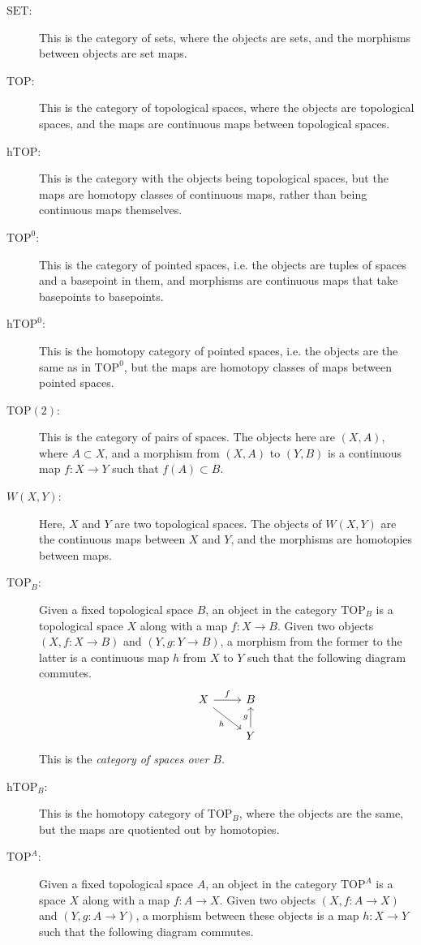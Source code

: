 \documentclass[12pt, notitlepage]{article}
\theoremstyle{definition}
\newcommand{\cat}[1]{\mathrm{#1}}
\begin{document}
\begin{description}
    \item[$\cat{SET}$:] This is the category of sets, where the objects are sets, and the morphisms between objects are set maps.
    \item[$\cat{TOP}$:] This is the category of topological spaces, where the objects are topological spaces, and the maps are continuous maps between topological spaces.
    \item[$\cat{hTOP}$:] This is the category with the objects being topological spaces, but the maps are homotopy classes of continuous maps, rather than being continuous maps themselves.
    \item[$\cat{TOP^0}$:] This is the category of pointed spaces, i.e. the objects are tuples of spaces and a basepoint in them, and morphisms are continuous maps that take basepoints to basepoints.
    \item[$\cat{hTOP^0}$:] This is the homotopy category of pointed spaces, i.e. the objects are the same as in $\cat{TOP^0}$, but the maps are homotopy classes of maps between pointed spaces.
    \item[$\cat{TOP(2)}$:] This is the category of pairs of spaces. The objects here are $(X,A)$, where $A \subset X$, and a morphism from $(X, A)$ to $(Y, B)$ is a continuous map $f: X \to Y$ such that $f(A) \subset B$.
    \item[$W(X,Y)$:] Here, $X$ and $Y$ are two topological spaces. The objects of $W(X,Y)$ are the continuous maps between $X$ and $Y$, and the morphisms are homotopies between maps.
    \item[$\cat{TOP}_B$:] Given a fixed topological space $B$, an object in the category $\cat{TOP}_B$ is a topological space $X$ along with a map $f: X \to B$. Given two objects $(X, f : X \to B)$ and $(Y, g : Y \to B)$, a morphism from the former to the latter is a continuous map $h$ from $X$ to $Y$ such that the following diagram commutes.
    \[
    \begin{tikzcd}
    X \arrow{r}{f} \arrow[swap]{dr}{h} & B  \\
    & Y \arrow{u}{g}
    \end{tikzcd}
    \]
    This is the \emph{category of spaces over $B$}.
    \item[$\cat{hTOP}_B$:] This is the homotopy category of $\cat{TOP}_B$, where the objects are the same, but the maps are quotiented out by homotopies.
    \item[$\cat{TOP}^A$:] Given a fixed topological space $A$, an object in the category $\cat{TOP}^A$ is a space $X$ along with a map $f: A \to X$. Given two objects $(X, f: A \to X)$ and $(Y, g: A \to Y)$, a morphism between these objects is a map $h: X \to Y$ such that the following diagram commutes.

\end{description}
\end{document}
